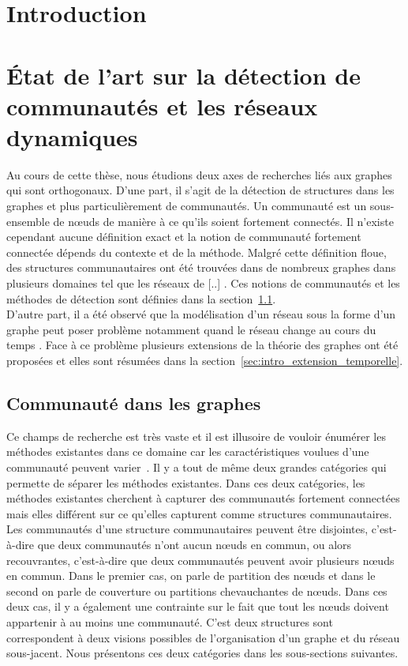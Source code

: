 
\chapter*{Introduction}

\chapter{État de l'art sur la détection de communautés et les réseaux dynamiques}
\minitoc
Au cours de cette thèse, nous étudions deux axes de recherches liés aux graphes qui sont orthogonaux.
D'une part, il s'agit de la détection de structures dans les graphes et plus particulièrement de communautés.
Un communauté est un sous-ensemble de n\oe uds de manière à ce qu'ils soient fortement connectés.
Il n'existe cependant aucune définition exact et la notion de communauté fortement connectée dépends du contexte et de la méthode.
Malgré cette définition floue, des structures communautaires ont été trouvées dans de nombreux graphes dans plusieurs domaines tel que les réseaux de [..] \REF.
Ces notions de communautés et les méthodes de détection sont définies dans la section~\ref{sec:intro_communaute}.\\

D'autre part, il a été observé que la modélisation d'un réseau sous la forme d'un graphe peut poser problème notamment quand le réseau change au cours du temps \REF.
Face à ce problème plusieurs extensions de la théorie des graphes ont été proposées et elles sont résumées dans la section~\ref{sec:intro_extension_temporelle}.



\section{Communauté dans les graphes}
\label{sec:intro_communaute}

Ce champs de recherche est très vaste et il est illusoire de vouloir énumérer les méthodes existantes dans ce domaine car les caractéristiques voulues d'une communauté peuvent varier~\cite{Coscia2011}.
Il y a tout de même deux grandes catégories qui permette de séparer les méthodes existantes.
Dans ces deux catégories, les méthodes existantes cherchent à capturer 
des communautés fortement connectées mais elles différent sur ce qu'elles capturent comme structures communautaires.
Les communautés d'une structure communautaires peuvent être disjointes, c'est-à-dire que deux communautés n'ont aucun n\oe uds en commun, ou alors recouvrantes, c'est-à-dire que deux communautés peuvent avoir plusieurs n\oe uds en commun.
Dans le premier cas, on parle de partition des n\oe uds et dans le second on parle de couverture ou partitions chevauchantes de n\oe uds.
Dans ces deux cas, il y a également une contrainte sur le fait que tout les n\oe uds doivent appartenir à au moins une communauté.
C'est deux structures sont correspondent à deux visions possibles de l'organisation d'un graphe et du réseau sous-jacent.
Nous présentons ces deux catégories dans les sous-sections suivantes.

